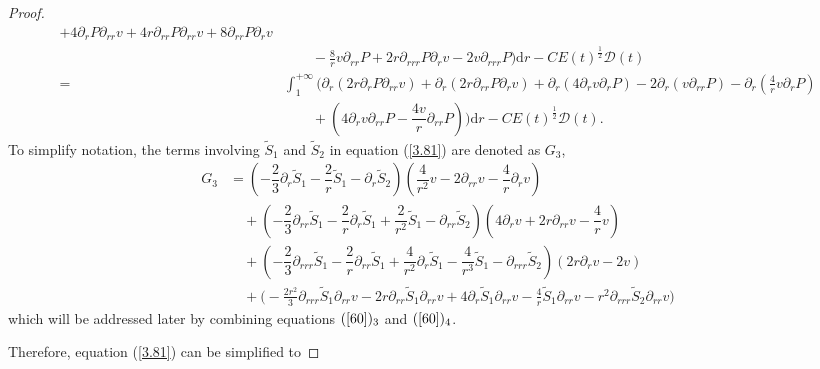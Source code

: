 \documentclass[10pt,reqno]{amsart}
\numberwithin{equation}{section}
\begin{document}
\begin{proof}
\begin{equation}
\begin{aligned}
				+4\partial_{r}P\partial_{rr}v
				+4r\partial_{rr}P\partial_{rr}v+8\partial_{rr}P\partial_{r}v\\
				&\qquad-\frac{8}{r}v\partial_{rr}P+2r\partial_{rrr}P\partial_{r}v-2v\partial_{rrr}P\bigg)\mathrm{d}r
				-C E(t)^{\frac{1}{2}}\mathcal{D}(t)\\
				=&\int_{1}^{+\infty}\bigg(\partial_{r}\left(2r\partial_{r}P\partial_{rr}v\right)+\partial_{r}\left(2r\partial_{rr}P\partial_{r}v\right)+
				\partial_{r}\left(4\partial_{r}v\partial_{r}P\right)
				-2\partial_{r}\left(v\partial_{rr}P\right)
				-\partial_{r}(\frac{4}{r}v\partial_{r}P)\\
				&\qquad+(4\partial_{r}v\partial_{rr}P-\dfrac{4 v}{r}\partial_{rr}P)\bigg)\mathrm{d}r
				-C E(t)^{\frac{1}{2}}\mathcal{D}(t).
			\end{aligned}
		\end{equation}
		To simplify notation, the terms involving $\tilde{S}_1$ and $\tilde{S}_2$ in equation (\ref{3.81}) are denoted as \(G_3\), 
		\begin{align*}\nonumber
				G_3&=
				\left(-\dfrac{2}{3}\partial_r \tilde{S}_1-\dfrac{2}{r} \tilde{S}_1-\partial_r \tilde{S}_2\right)(\dfrac{4}{r^2}v-2\partial_{rr}v-\dfrac{4}{r}\partial_{r}v)\\
				&\quad+\left(-\dfrac{2}{3}\partial_{rr}  \tilde{S}_1-\dfrac{2}{r} \partial_r \tilde{S}_1+\dfrac{2}{r^2}\tilde{S}_1-\partial_{rr} \tilde{S}_2\right)(4\partial_{r}v+2r\partial_{rr}v-\dfrac{4}{r}v)\\
				&\quad+\left(-\dfrac{2}{3}\partial_{rrr}  \tilde{S}_1-\dfrac{2}{r} \partial_{rr} \tilde{S}_1+\dfrac{4}{r^2}\partial_{r}\tilde{S}_1-\dfrac{4}{r^3}\tilde{S}_1-\partial_{rrr} \tilde{S}_2\right)
				(2r\partial_{r}v-2v)\\
				&\quad+\bigg(-\frac{2 r^2}{3} \partial_{rrr}\tilde{S}_1 \partial_{rr}v-2r\partial_{rr}\tilde{S}_1\partial_{rr}v+4\partial_{r}\tilde{S}_1  \partial_{rr}v-\frac{4}{r}\tilde{S}_1\partial_{rr}v
				-r^2 \partial_{rrr}\tilde{S}_2 \partial_{rr}v\bigg)
		\end{align*}
		which will be addressed later by combining equations $(\ref{60})_3$ and $(\ref{60})_4$.
		
		Therefore, equation (\ref{3.81}) can be simplified to
		

\end{proof}
\end{document}
